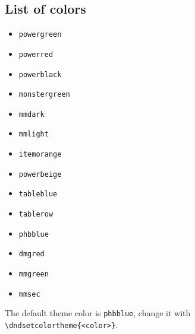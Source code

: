 \subsection{List of colors}

\begin{itemize}
	\item \color{powergreen}\texttt{powergreen}
	\item \color{powerred}\texttt{powerred}
	\item \color{powerblack}\texttt{powerblack}
	\item \color{monstergreen}\texttt{monstergreen}
	\item \color{mmdark}\texttt{mmdark}
	\item \color{mmlight}\texttt{mmlight}
	\item \color{itemorange}\texttt{itemorange}
	\item \color{powerbeige}\texttt{powerbeige}
	\item \color{tableblue}\texttt{tableblue}
	\item \color{tablerow}\texttt{tablerow}
	\item \color{phbblue}\texttt{phbblue}
	\item \color{dmgred}\texttt{dmgred}
	\item \color{mmgreen}\texttt{mmgreen}
	\item \color{mmsec}\texttt{mmsec}
\end{itemize}

The default theme color is \color{phbblue}\texttt{phbblue}\color{black}, change it with \texttt{\textbackslash dndsetcolortheme\{<color>\}}.


